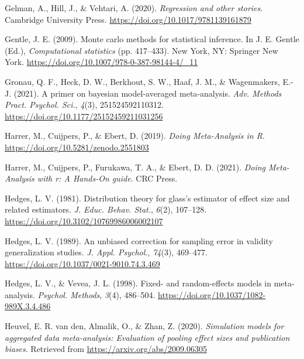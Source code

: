 \documentclass[
  man,floatsintext]{apa6}
\newlength{\cslhangindent}
\newlength{\cslentryspacingunit} %
\newenvironment{CSLReferences}[2] %
 {%
  \setlength{\parindent}{0pt}
  \ifodd #1
  \let\oldpar\par
  \def\par{\hangindent=\cslhangindent\oldpar}
  \fi
  \setlength{\parskip}{#2\cslentryspacingunit}
 }%
 {}
\begin{document}
\begin{CSLReferences}{1}{0}
\leavevmode{}%
Gelman, A., Hill, J., \& Vehtari, A. (2020). \emph{Regression and other stories}. Cambridge University Press. \url{https://doi.org/10.1017/9781139161879}

\leavevmode{}%
Gentle, J. E. (2009). Monte carlo methods for statistical inference. In J. E. Gentle (Ed.), \emph{Computational statistics} (pp. 417--433). New York, NY: Springer New York. \url{https://doi.org/10.1007/978-0-387-98144-4/_11}

\leavevmode{}%
Gronau, Q. F., Heck, D. W., Berkhout, S. W., Haaf, J. M., \& Wagenmakers, E.-J. (2021). A primer on bayesian model-averaged meta-analysis. \emph{Adv. Methods Pract. Psychol. Sci.}, \emph{4}(3), 251524592110312. \url{https://doi.org/10.1177/25152459211031256}

\leavevmode{}%
Harrer, M., Cuijpers, P., \& Ebert, D. (2019). \emph{Doing {Meta-Analysis} in {R}}. \url{https://doi.org/10.5281/zenodo.2551803}

\leavevmode{}%
Harrer, M., Cuijpers, P., Furukawa, T. A., \& Ebert, D. D. (2021). \emph{Doing {Meta-Analysis} with r: A {Hands-On} guide}. CRC Press.

\leavevmode{}%
Hedges, L. V. (1981). Distribution theory for glass's estimator of effect size and related estimators. \emph{J. Educ. Behav. Stat.}, \emph{6}(2), 107--128. \url{https://doi.org/10.3102/10769986006002107}

\leavevmode{}%
Hedges, L. V. (1989). An unbiased correction for sampling error in validity generalization studies. \emph{J. Appl. Psychol.}, \emph{74}(3), 469--477. \url{https://doi.org/10.1037/0021-9010.74.3.469}

\leavevmode{}%
Hedges, L. V., \& Vevea, J. L. (1998). Fixed- and random-effects models in meta-analysis. \emph{Psychol. Methods}, \emph{3}(4), 486--504. \url{https://doi.org/10.1037/1082-989X.3.4.486}

\leavevmode{}%
Heuvel, E. R. van den, Almalik, O., \& Zhan, Z. (2020). \emph{Simulation models for aggregated data meta-analysis: Evaluation of pooling effect sizes and publication biases}. Retrieved from \url{https://arxiv.org/abs/2009.06305}


\end{CSLReferences}
\end{document}
